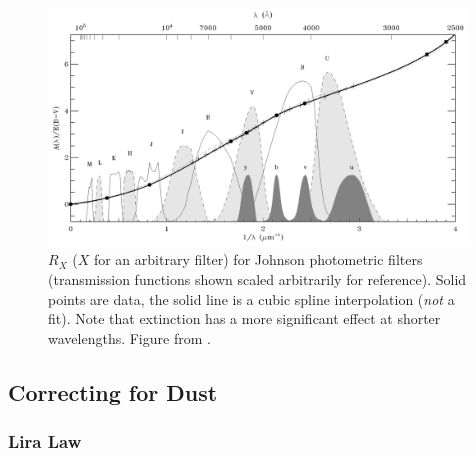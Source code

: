 \begin{figure}
    \centering
    \includegraphics[width=0.99\textwidth]{figs/fitzpatrick1999.png}
    \caption{$R_{X}$ ($X$ for an arbitrary filter) for Johnson photometric filters (transmission functions shown scaled arbitrarily for reference). Solid points are data, the solid line is a cubic spline interpolation (\textit{not} a fit). Note that extinction has a more significant effect at shorter wavelengths. Figure from \cite{Fitzpatrick1999}.}
    \label{fig:phot_reddening}
\end{figure}

\subsection{Correcting for Dust}
\subsubsection{Lira Law}